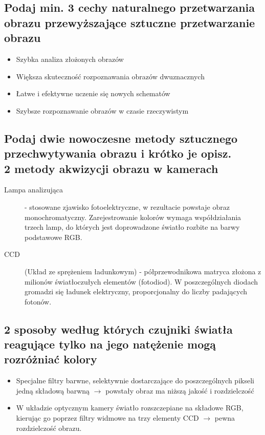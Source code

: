 \documentclass[a4paper, 12pt, titlepage]{article}
\begin{document}
\subsection{Podaj min. 3 cechy naturalnego przetwarzania obrazu przewyższające sztuczne przetwarzanie obrazu}
\begin{itemize}[noitemsep]
	\item Szybka analiza złożonych obrazów
	\item Większa skuteczność rozpoznawania obrazów dwuznacznych
	\item Łatwe i efektywne uczenie się nowych schematów
	\item Szybsze rozpoznawanie obrazów w czasie rzeczywistym
\end{itemize}

\subsection{Podaj dwie nowoczesne metody sztucznego przechwytywania obrazu i krótko je opisz. \\ 2 metody akwizycji obrazu w kamerach}
\begin{description}
	\item[Lampa analizująca] - stosowane zjawisko fotoelektryczne, w rezultacie powstaje obraz monochromatyczny. Zarejestrowanie kolorów wymaga współdziałania trzech lamp, do których jest doprowadzone światło rozbite na barwy podstawowe RGB.
	\item[CCD] (Układ ze sprężeniem ładunkowym) - półprzewodnikowa matryca złożona z milionów światłoczułych elementów (fotodiod). W poszczególnych diodach gromadzi się ładunek elektryczny, proporcjonalny do liczby padających fotonów.
\end{description}

\subsection{2 sposoby według których czujniki światła reagujące tylko na jego natężenie mogą rozróżniać kolory}
\begin{itemize}
	\item Specjalne filtry barwne, selektywnie dostarczające do poszczególnych pikseli jedną składową barwną $\rightarrow$ powstały obraz ma niższą jakość i rozdzielczość
	\item W układzie optycznym kamery światło rozszczepiane na składowe RGB, kierując go poprzez filtry widmowe na trzy elementy CCD $\rightarrow$ pewna rozdzielczość obrazu.
\end{itemize}
\end{document}
